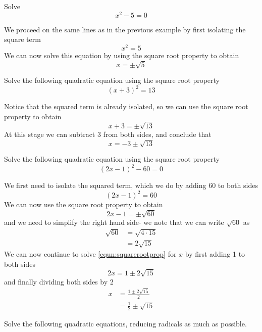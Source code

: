 \begin{myexample}
Solve 
\[
	x^2-5=0
\]
{}
\end{myexample}
\begin{myProof}
	We proceed on the same lines as in the previous example by first isolating the square term
	\[
		x^2=5
	\]
	We can now solve this equation by using the square root property to obtain
	\[
		x = \pm \sqrt{5}
	\]
	{}
\end{myProof} 

\begin{myexample}
Solve the following quadratic equation using the square root property
\[
	(x+3)^2 = 13
\]
{}
\end{myexample}
\begin{myProof}
	Notice that the squared term is already isolated, so we can use the square root property
	to obtain
	\[
		x+3 = \pm \sqrt{13}
	\]
	At this stage we can subtract 3 from both sides, and conclude that
	\[
		x = -3 \pm \sqrt{13}
	\]
	{}
\end{myProof} 
\begin{myexample}
Solve the following quadratic equation using the square root property
\[
	(2x-1)^2 - 60=0
\]
{}
\end{myexample}
\begin{myProof}
	We first need to isolate the squared term, which we do by adding 60 to both sides
	\[
		(2x-1)^2=60
	\]
	We can now use the square root property to obtain
	\begin{equation}\label{equn:squarerootprop}
		2x-1 = \pm \sqrt{60}
	\end{equation}
	and we need to simplify the right hand side- we note that we can write $\sqrt{60}$ as
	\begin{align*}
		\sqrt{60} & =  \sqrt{4\cdot 15} \\
		          & =  2\sqrt{15}       
	\end{align*} 
	We can now continue to solve \cref{equn:squarerootprop} for $x$ by first adding 1 to both sides
	\[
		2x = 1 \pm 2\sqrt{15}
	\]
	and finally dividing both sides by 2
	\begin{align*}
		x & =   \frac{1\pm 2\sqrt{15}}{2} \\
		  & =  \frac{1}{2}\pm \sqrt{15}   
	\end{align*} 
\end{myProof}

\begin{myexample}
\drillandskill
Solve the following quadratic equations, reducing radicals as much as possible.
\end{myexample}

